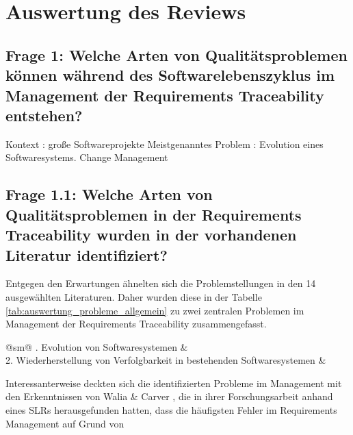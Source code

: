\section{Auswertung des Reviews}

\subsection{Frage 1: Welche Arten von Qualitätsproblemen können während des Softwarelebenszyklus im Management der Requirements Traceability entstehen?}

Kontext : große Softwareprojekte
Meistgenanntes Problem : Evolution eines Softwaresystems. Change Management

\subsection{Frage 1.1: Welche Arten von Qualitätsproblemen in der Requirements Traceability wurden in der vorhandenen Literatur identifiziert?}

Entgegen den Erwartungen ähnelten sich die Problemstellungen in den 14 ausgewählten Literaturen. Daher wurden diese in der Tabelle \ref{tab:auswertung_probleme_allgemein} zu zwei zentralen Problemen im Management der Requirements Traceability zusammengefasst.

\begin{table}[!ht]
\renewcommand{\arraystretch}{1.3}
\caption{Probleme in der Requirements Traceability}
\label{tab:auswertung_probleme_allgemein}
\centering
\begin{tabularx}{\columnwidth}{@{}sm@{}}
. Evolution von Softwaresystemen & \cite{Saputri2016EnsuringApproach,Bavota2014EnhancingInformation,Spanoudakis2004Rule-basedRelations,Javed2014ACode,Tsuchiya2015InteractiveLogs,Omoronyia2011ExploringTraceability,Lago2009AManagement, Mader2009EnablingRelations,Mder2012TowardsMaintenance,Ghabi2015ExploitingCode} \\
2. Wiederherstellung von Verfolgbarkeit in bestehenden Softwaresystemen & \cite{Mder2007CustomizingProcess,Leuser2010TacklingSpecifications,Merten2016DoData} \\
\bottomrule
\end{tabularx} 
\end{table}

Interessanterweise deckten sich die identifizierten Probleme im Management mit den Erkenntnissen von Walia \& Carver \cite{Walia2009AErrors}, die in ihrer Forschungsarbeit anhand eines SLRs herausgefunden hatten, dass die häufigsten Fehler im Requirements Management auf Grund von


